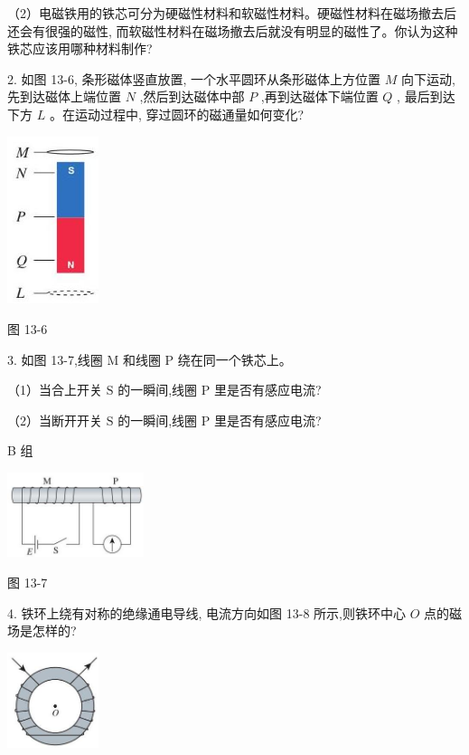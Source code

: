 \documentclass[10pt]{article}
\begin{document}
（2）电磁铁用的铁芯可分为硬磁性材料和软磁性材料。硬磁性材料在磁场撤去后还会有很强的磁性, 而软磁性材料在磁场撤去后就没有明显的磁性了。你认为这种铁芯应该用哪种材料制作?

2. 如图 13-6, 条形磁体竖直放置, 一个水平圆环从条形磁体上方位置 \(M\) 向下运动,先到达磁体上端位置 \(N\) ,然后到达磁体中部 \(P\) ,再到达磁体下端位置 \(Q\) , 最后到达下方 \(L\) 。在运动过程中, 穿过圆环的磁通量如何变化?

\begin{center}
\includegraphics[max width=0.2\textwidth]{images/01911d5f-8e38-70c0-b5b8-2b399bd115b6_135_855799.jpg}
\end{center}

图 13-6

3. 如图 13-7,线圈 \(\mathrm{M}\) 和线圈 \(\mathrm{P}\) 绕在同一个铁芯上。

（1）当合上开关 \(\mathrm{S}\) 的一瞬间,线圈 \(\mathrm{P}\) 里是否有感应电流?

（2）当断开开关 \(\mathrm{S}\) 的一瞬间,线圈 \(\mathrm{P}\) 里是否有感应电流?

B 组

\begin{center}
\includegraphics[max width=0.3\textwidth]{images/01911d5f-8e38-70c0-b5b8-2b399bd115b6_135_455001.jpg}
\end{center}

图 13-7

4. 铁环上绕有对称的绝缘通电导线, 电流方向如图 13-8 所示,则铁环中心 \(O\) 点的磁场是怎样的?

\begin{center}
\includegraphics[max width=0.2\textwidth]{images/01911d5f-8e38-70c0-b5b8-2b399bd115b6_135_326323.jpg}
\end{center}
\end{document}
